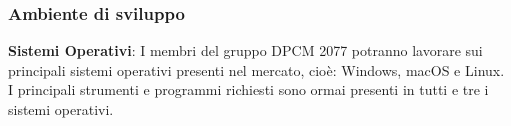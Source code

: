 \subsubsection{Ambiente di sviluppo}
\begin{description}
\item{\textbf{Sistemi Operativi}}: I membri del gruppo DPCM 2077 potranno lavorare sui principali sistemi operativi presenti nel mercato, cioè: Windows, macOS e Linux.
I principali strumenti e programmi richiesti sono ormai presenti in tutti e tre i sistemi operativi.
\end{description}


